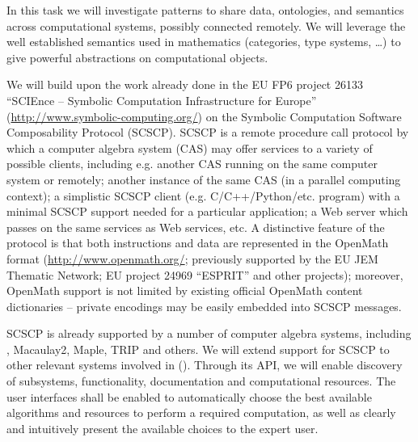 \begin{workpackage}[id=component-architecture,wphases=0-48!.5,
  title=Component Architecture,lead=UV,
  PSRM=24,UVRM=8,SARM=16, USHRM=4]
\begin{tasklist}
  \begin{task}[title=Interfaces between systems,id=interface-systems,lead=PS,PM=18]
    In this task we will investigate patterns to share data,
    ontologies, and semantics across computational systems, possibly
    connected remotely.  We will leverage the well established
    semantics used in mathematics (categories, type systems, \dots) to
    give powerful abstractions on computational objects.
    
    We will build upon the work already done in the EU FP6 project
    26133 ``SCIEnce -- Symbolic Computation Infrastructure for
    Europe'' (\url{http://www.symbolic-computing.org/}) on the Symbolic Computation
    Software Composability Protocol (SCSCP). SCSCP is a remote
    procedure call protocol by which a computer algebra system (CAS)
    may offer services to a variety of possible clients, including
    e.g.  another CAS running on the same computer system or remotely;
    another instance of the same CAS (in a parallel computing
    context); a simplistic SCSCP client
    (e.g. C/C++/Python/etc. program) with a minimal SCSCP support
    needed for a particular application; a Web server which passes on
    the same services as Web services, etc.  A distinctive feature of
    the protocol is that both instructions and data are represented in
    the OpenMath format (\url{http://www.openmath.org/}; previously
    supported by the EU JEM Thematic Network; EU project 24969
    ``ESPRIT'' and other projects); moreover, OpenMath support is not
    limited by existing official OpenMath content dictionaries --
    private encodings may be easily embedded into SCSCP messages.
    
    SCSCP is already supported by a number of computer algebra
    systems, including \GAP, Macaulay2, Maple, TRIP and others. We
    will extend support for SCSCP to other relevant systems involved
    in \TheProject ().
    Through its API, we will enable discovery of subsystems,
    functionality, documentation and computational resources. The user
    interfaces shall be enabled to automatically choose the best
    available algorithms and resources to perform a required
    computation, as well as clearly and intuitively present the
    available choices to the expert user.


\end{task}
\end{tasklist}
\end{workpackage}
